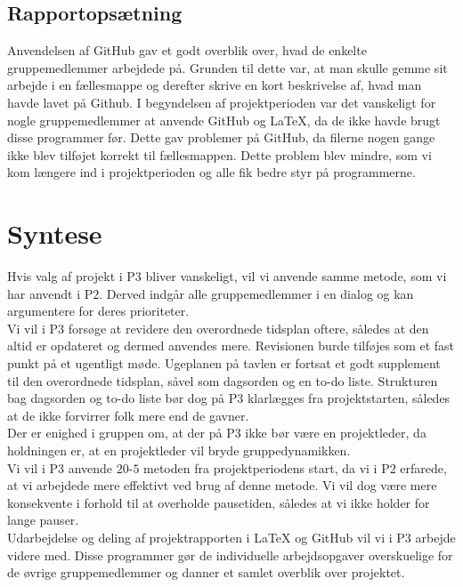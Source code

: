 \subsection{Rapportopsætning}
Anvendelsen af GitHub gav et godt overblik over, hvad de enkelte gruppemedlemmer arbejdede på. Grunden til dette var, at man skulle gemme sit arbejde i en fællesmappe og derefter skrive en kort beskrivelse af, hvad man havde lavet på Github. 
I begyndelsen af projektperioden var det vanskeligt for nogle gruppemedlemmer at anvende GitHub og LaTeX, da de ikke havde brugt disse programmer før. Dette gav problemer på GitHub, da filerne nogen gange ikke blev tilføjet korrekt til fællesmappen. Dette problem blev mindre, som vi kom længere ind i projektperioden og alle fik bedre styr på programmerne. 

\section{Syntese}
Hvis valg af projekt i P$3$ bliver vanskeligt, vil vi anvende samme metode, som vi har anvendt i P$2$. Derved indgår alle gruppemedlemmer i en dialog og kan argumentere for deres prioriteter. \\
Vi vil i P$3$ forsøge at revidere den overordnede tidsplan oftere, således at den altid er opdateret og dermed anvendes mere. Revisionen burde tilføjes som et fast punkt på et ugentligt møde. Ugeplanen på tavlen er fortsat et godt supplement til den overordnede tidsplan, såvel som dagsorden og en to-do liste. Strukturen bag dagsorden og to-do liste bør dog på P$3$ klarlægges fra projektstarten, således at de ikke forvirrer folk mere end de gavner. \\
Der er enighed i gruppen om, at der på P$3$ ikke bør være en projektleder, da holdningen er, at en projektleder vil bryde gruppedynamikken. \\
Vi vil i P$3$ anvende $20$-$5$ metoden fra projektperiodens start, da vi i P$2$ erfarede, at vi arbejdede mere effektivt ved brug af denne metode. Vi vil dog være mere konsekvente i forhold til at overholde pausetiden, således at vi ikke holder for lange pauser. \\ 
Udarbejdelse og deling af projektrapporten i LaTeX og GitHub vil vi i P$3$ arbejde videre med. Disse programmer gør de individuelle arbejdsopgaver overskuelige for de øvrige gruppemedlemmer og danner et samlet overblik over projektet.   